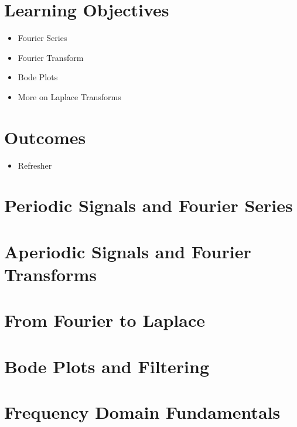 \section*{Learning Objectives}

\begin{itemize}
\item Fourier Series
\item Fourier Transform
\item Bode Plots
\item More on Laplace Transforms
\end{itemize}

\section*{Outcomes}
\begin{itemize}
\item Refresher 
\end{itemize}

\newpage

\section{Periodic Signals and Fourier Series}

\section{Aperiodic Signals and Fourier Transforms}

\section{From Fourier to Laplace}

\section{Bode Plots and Filtering}

\section{Frequency Domain Fundamentals}


